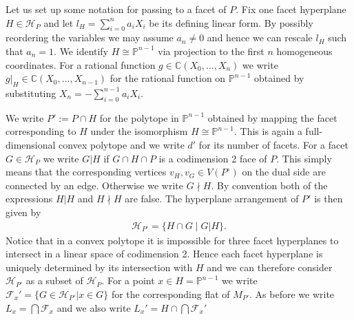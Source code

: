 \documentclass[a4paper,10pt]{amsart}
\theoremstyle{definition}
\theoremstyle{plain}
\newcommand{\cF}{{\mathcal F}}
\newcommand{\cH}{{\mathcal H}}
\newcommand{\C}{{\mathbb C}}
\newcommand{\pp}{\mathbb{P}}
\begin{document}
 Let us set up some notation for passing to a facet of $P$. Fix one facet hyperplane $H\in \cH_P$ and let $l_H=\sum_{i=0}^na_iX_i$ be its defining linear form. By possibly reordering the variables we may assume $a_n\neq 0$ and hence we can rescale $l_H$ such that $a_n=1$. We identify $H\cong \pp^{n-1}$ via projection to the first $n$ homogeneous coordinates. For a rational function $g\in \C(X_0,\ldots,X_n)$ we write $g|_H\in \C(X_0,\ldots,X_{n-1})$ for the rational function on $\pp^{n-1}$ obtained by substituting $X_n=-\sum_{i=0}^{n-1}a_iX_i$.
 
 We write $P':=P\cap H$ for the polytope in $\pp^{n-1}$ obtained by mapping the facet corresponding to $H$ under the isomorphism $H\cong \pp^{n-1}$. This is again a full-dimensional convex polytope and we write $d'$ for its number of facets. For a facet $G\in \cH_P$ we write $G|H$ if $G\cap H \cap P$ is a codimension 2 face of $P$. This simply means that the corresponding vertices $v_H,v_G\in V(P^\circ)$ on the dual side are connected by an edge. Otherwise we write $G\nmid H$. By convention both of the expressions $H|H$ and $H\nmid H$ are false. The hyperplane arrangement of $P'$ is then given by \begin{align*}
     \cH_{P'}=\{H\cap G \mid G|H\}.
 \end{align*}
 Notice that in a convex polytope it is impossible for three facet hyperplanes to intersect in a linear space of codimension 2. Hence each facet hyperplane is uniquely determined by its intersection with $H$ and we can therefore consider $\cH_{P'}$ as a subset of $\cH_P$. For a point $x \in H=\pp^{n-1}$ we write $\cF_x'=\{G\in \cH_{P'}| x \in G\}$ for the corresponding flat of $M_{P'}$. As before we write $L_x=\bigcap \cF_x$ and we also write $L_x'=H\cap \bigcap \cF_x'$
\end{document}

